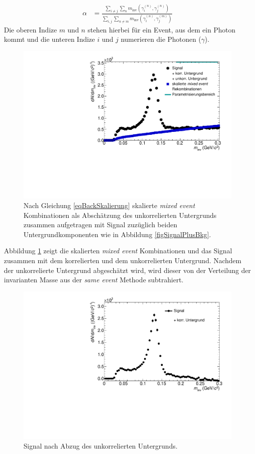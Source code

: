 \begin{align}
\label{eqBackSkalierung}
\alpha &= \frac{\sum_{i \neq j}\sum_{n}m_{\text{inv}}\left( \gamma^{(n)}_{i},\gamma^{(n)}_{j}\right) }{\sum_{i,j}\sum_{n \neq m}m_{\text{inv}}\left( \gamma^{(n)}_{i},\gamma^{(m)}_{j}\right) }
\end{align}
Die oberen Indize $m$ und $n$ stehen hierbei für ein Event, aus dem ein Photon kommt und die unteren Indize $i$ und $j$ numerieren die Photonen ($\gamma$).
\begin{figure}[tp]
\centering
\includegraphics[width=.75\linewidth]{hUncorrBkgNorm.pdf}
\caption{Nach Gleichung \ref{eqBackSkalierung} skalierte {\it mixed event} Kombinationen als Abschätzung des unkorrelierten Untergrunds zusammen aufgetragen mit Signal zuzüglich beiden Untergrundkomponenten wie in Abbildung \ref{figSignalPlusBkg}.}
\label{figUncorrBkgNorm}
\end{figure}
\newline
Abbildung \ref{figUncorrBkgNorm} zeigt die skalierten \textit{mixed event} Kombinationen und das Signal zusammen mit dem korrelierten und dem unkorrelierten Untergrund.
Nachdem der unkorrelierte Untergrund abgeschätzt wird, wird dieser von der Verteilung der invarianten Masse aus der \textit{same event} Methode subtrahiert.
\begin{figure}[tp]
\centering
\includegraphics[width=.75\linewidth]{hInvMass_Data.pdf}
\caption{Signal nach Abzug des unkorrelierten Untergrunds.}
\label{figInvMass_Data}
\end{figure}

